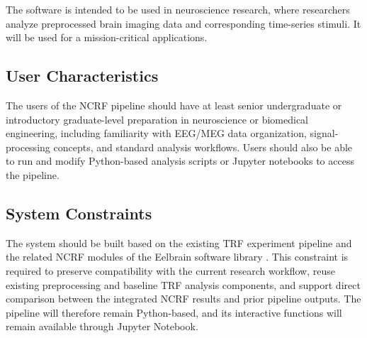 \documentclass[12pt]{article}
\renewcommand{\progname}{Integrating NCRF into existing pipeline}
\begin{document}
The software is intended to be used in neuroscience research, where researchers analyze preprocessed brain imaging data and corresponding time-series stimuli. It will be used for a mission-critical applications.


\subsection{User Characteristics} \label{SecUserCharacteristics}
The users of the NCRF pipeline should have at least senior undergraduate or introductory graduate-level preparation in neuroscience or biomedical engineering, including familiarity with EEG/MEG data organization, signal-processing concepts, and standard analysis workflows. Users should also be able to run and modify Python-based analysis scripts or Jupyter notebooks to access the pipeline.


\subsection{System Constraints}
The system should be built based on the existing TRF experiment pipeline and the related NCRF modules of the Eelbrain software library \citep{BrodbeckEelbrain}. This constraint is required to preserve compatibility with the current research workflow, reuse existing preprocessing and baseline TRF analysis components, and support direct comparison between the integrated NCRF results and prior pipeline outputs. The pipeline will therefore remain Python-based, and its interactive functions will remain available through Jupyter Notebook.
\end{document}
